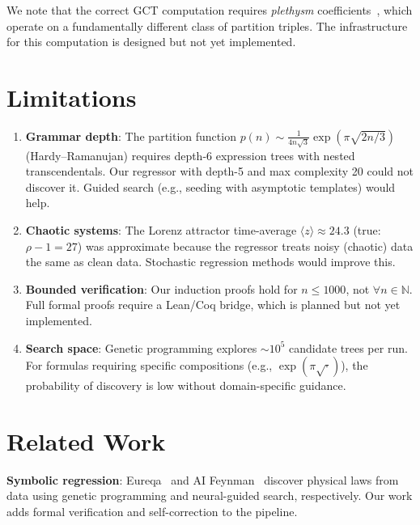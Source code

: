 \documentclass[11pt,a4paper]{article}
\begin{document}
We note that the correct GCT computation requires \emph{plethysm}
coefficients~\citep{burgisser2019}, which operate on a fundamentally
different class of partition triples. The infrastructure for this
computation is designed but not yet implemented.


\section{Limitations}
\label{sec:limitations}

\begin{enumerate}
  \item \textbf{Grammar depth}: The partition function $p(n) \sim
    \frac{1}{4n\sqrt{3}} \exp\!\left(\pi\sqrt{2n/3}\right)$ (Hardy--Ramanujan)
    requires depth-6 expression trees with nested transcendentals. Our
    regressor with depth-5 and max complexity 20 could not discover it.
    Guided search (e.g., seeding with asymptotic templates) would help.

  \item \textbf{Chaotic systems}: The Lorenz attractor time-average
    $\langle z \rangle \approx 24.3$ (true: $\rho - 1 = 27$) was
    approximate because the regressor treats noisy (chaotic) data the same
    as clean data. Stochastic regression methods would improve this.

  \item \textbf{Bounded verification}: Our induction proofs hold for
    $n \leq 1000$, not $\forall n \in \mathbb{N}$. Full formal proofs
    require a Lean/Coq bridge, which is planned but not yet implemented.

  \item \textbf{Search space}: Genetic programming explores
    $\sim 10^5$ candidate trees per run. For formulas requiring specific
    compositions (e.g., $\exp(\pi\sqrt{\cdot})$), the probability of
    discovery is low without domain-specific guidance.
\end{enumerate}


\section{Related Work}
\label{sec:related}

\textbf{Symbolic regression}: Eureqa~\citep{schmidt2009} and
AI Feynman~\citep{udrescu2020} discover physical laws from data using
genetic programming and neural-guided search, respectively. Our work adds
formal verification and self-correction to the pipeline.
\end{document}
